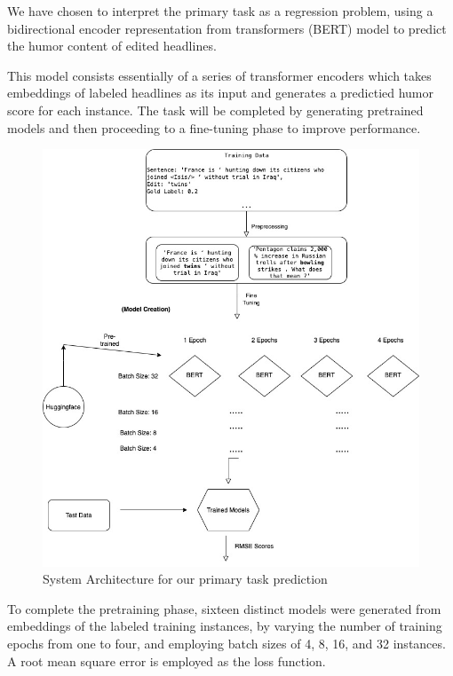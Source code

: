 \documentclass{article}
\begin{document}
We have chosen to interpret the primary task as a regression problem, using a bidirectional encoder representation from transformers (BERT) model to predict the humor content of edited headlines.

This model \cite{DBLP:journals/corr/abs-1810-04805} consists essentially of a series of transformer encoders which takes embeddings of labeled headlines as its input and generates a predictied humor score for each instance. The task will be completed by generating pretrained models and then proceeding to a fine-tuning phase to improve performance.

\begin{figure}
\includegraphics[scale=0.25]{classifier.jpg}
\caption{System Architecture for our primary task prediction}
\end{figure}

To complete the pretraining phase, sixteen distinct models were generated from embeddings of the labeled training instances, by varying the number of training epochs from one to four, and employing batch sizes of 4, 8, 16, and 32 instances. A root mean square error is employed as the loss function.
\end{document}

